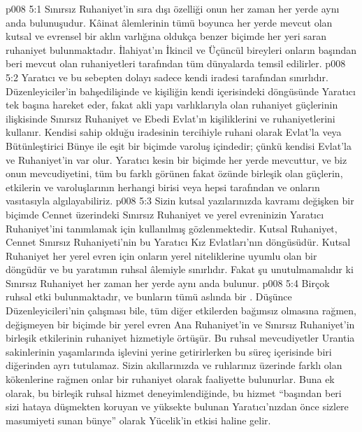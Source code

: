 \vs p008 5:1 Sınırsız Ruhaniyet’in sıra dışı özelliği onun her zaman her yerde aynı anda bulunuşudur. Kâinat âlemlerinin tümü boyunca her yerde mevcut olan kutsal ve evrensel bir aklın varlığına oldukça benzer biçimde her yeri saran ruhaniyet bulunmaktadır. İlahiyat’ın İkincil ve Üçüncül bireyleri onların başından beri mevcut olan ruhaniyetleri tarafından tüm dünyalarda temsil edilirler.
\vs p008 5:2 Yaratıcı  ve bu sebepten dolayı sadece kendi iradesi tarafından sınırlıdır. Düzenleyiciler’in bahşedilişinde ve kişiliğin kendi içerisindeki döngüsünde Yaratıcı tek başına hareket eder, fakat akli yapı varlıklarıyla olan ruhaniyet güçlerinin ilişkisinde Sınırsız Ruhaniyet ve Ebedi Evlat’ın kişiliklerini ve ruhaniyetlerini kullanır. Kendisi sahip olduğu iradesinin tercihiyle ruhani olarak Evlat’la veya Bütünleştirici Bünye ile eşit bir biçimde varoluş içindedir; çünkü kendisi Evlat’la  ve Ruhaniyet’in  var olur. Yaratıcı kesin bir biçimde her yerde mevcuttur, ve biz onun mevcudiyetini, tüm bu farklı görünen fakat özünde birleşik olan güçlerin, etkilerin ve varoluşlarının herhangi birisi veya hepsi tarafından ve onların vasıtasıyla algılayabiliriz.
\vs p008 5:3 Sizin kutsal yazılarınızda  kavramı değişken bir biçimde Cennet üzerindeki Sınırsız Ruhaniyet ve yerel evreninizin Yaratıcı Ruhaniyet’ini tanımlamak için kullanılmış gözlenmektedir. Kutsal Ruhaniyet, Cennet Sınırsız Ruhaniyeti’nin bu Yaratıcı Kız Evlatları’nın döngüsüdür. Kutsal Ruhaniyet her yerel evren için onların yerel niteliklerine uyumlu olan bir döngüdür ve bu yaratımın ruhsal âlemiyle sınırlıdır. Fakat şu unutulmamalıdır ki Sınırsız Ruhaniyet her zaman her yerde aynı anda bulunur.
\vs p008 5:4 Birçok ruhsal etki bulunmaktadır, ve bunların tümü aslında bir . Düşünce Düzenleyicileri’nin çalışması bile, tüm diğer etkilerden bağımsız olmasına rağmen, değişmeyen bir biçimde bir yerel evren Ana Ruhaniyet’in ve Sınırsız Ruhaniyet’in birleşik etkilerinin ruhaniyet hizmetiyle örtüşür. Bu ruhsal mevcudiyetler Urantia sakinlerinin yaşamlarında işlevini yerine getirirlerken bu süreç içerisinde biri diğerinden ayrı tutulamaz. Sizin akıllarınızda ve ruhlarınız üzerinde farklı olan kökenlerine rağmen onlar bir ruhaniyet olarak faaliyette bulunurlar. Buna ek olarak, bu birleşik ruhsal hizmet deneyimlendiğinde, bu hizmet “başından beri sizi hataya düşmekten koruyan ve yüksekte bulunan Yaratıcı’nızdan önce sizlere masumiyeti sunan bünye” olarak Yücelik’in etkisi haline gelir.
